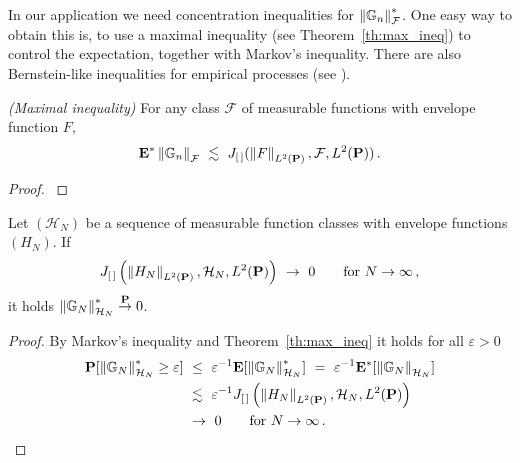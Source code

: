 In our application we need concentration inequalities for 
$
  \left\lVert\mathbb{G}_n\right\rVert^*_\mathcal{F}
$.
One easy way to obtain this is, to use a maximal inequality (see Theorem~\ref{th:max_ineq}) to control the expectation,
together with Markov's inequality. There are also Bernstein-like inequalities for empirical processes (see \cite[§2.14.2]{vaart2013}). 
\begin{theorem}
  \label{th:max_ineq}
  \emph{(Maximal inequality)}
  For any class $\mathcal{F}$ of measurable functions with envelope function $F,$
  \begin{gather*}
    \E^*
    \norm{
      \G
      _n
      }
      _\mathcal{F}
    \ 
    \lesssim
    \ 
    J
    _{[\,]}
    (
    \norm{
      F
    }
    _{ L^2(\P)}
    ,
    \mathcal{F}
    ,
    L^2(\P)
    )
    \, 
    .
  \end{gather*}
\end{theorem}
\begin{proof}
  \cite[Corollary~19.35]{Vaart2000}
\end{proof}

\begin{lemma}
  \label{markov_max_lemma}
  Let $(\mathcal{H}_N)$ be a sequence of measurable function classes with envelope functions $(H_N)$.
  If
  \begin{gather*}
    J_{[\, ]}
    \left( 
    \norm{H_N}_{ L^2(\P)}
    ,
    \mathcal{H}_N
    ,
     L^2(\P)
    \right)
    \ 
    \to
    \ 
    0
    \qquad
    \text{for}
    \ 
    N
    \to
    \infty
    \,,
  \end{gather*}
  it holds 
  $
  \left\lVert\mathbb{G}_N\right\rVert^*_{\mathcal{H}_N}\overset{\mathbf{P}}{\to}0
  $.
\end{lemma}
\begin{proof}
  By Markov's inequality and Theorem~\ref{th:max_ineq} it holds for all $\varepsilon>0$
  \begin{align*}
    \P
    [
  \norm{\G_N}^*_{\mathcal{H}_N}
  \ge
  \varepsilon
    ]
    &
    \ 
    \le
    \ 
    \varepsilon^{-1}
    \E
    [
  \norm{\G_N}^*_{\mathcal{H}_N}
    ]
    \ 
    =
    \ 
    \varepsilon^{-1}
    \E^*
    [
  \norm{\G_N}_{\mathcal{H}_N}
    ]
    \\
    &
    \ 
    \lesssim
    \ 
    \varepsilon^{-1}
    J_{[\, ]}
    \left( 
    \norm{H_N}_{ L^2(\P)}
    ,
    \mathcal{H}_N
    ,
     L^2(\P)
    \right)
    \\
    &
    \ 
    \to
    \ 
    0
    \qquad
    \text{for}
    \ 
    N\to\infty
    \,.
  \end{align*}
\end{proof}

